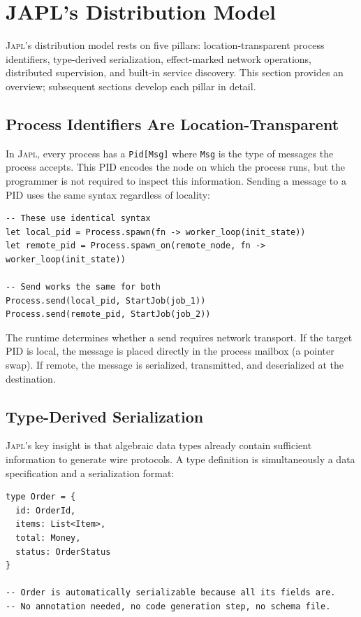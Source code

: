 \documentclass[11pt,a4paper]{article}
\newcommand{\japl}{\textsc{Japl}}
\begin{document}
\section{JAPL's Distribution Model}
\label{sec:japl-model}

\japl{}'s distribution model rests on five pillars: location-transparent
process identifiers, type-derived serialization, effect-marked network
operations, distributed supervision, and built-in service discovery. This
section provides an overview; subsequent sections develop each pillar in
detail.

\subsection{Process Identifiers Are Location-Transparent}

In \japl{}, every process has a \texttt{Pid[Msg]} where \texttt{Msg} is the
type of messages the process accepts. This PID encodes the node on which the
process runs, but the programmer is not required to inspect this information.
Sending a message to a PID uses the same syntax regardless of locality:

\begin{lstlisting}
-- These use identical syntax
let local_pid = Process.spawn(fn -> worker_loop(init_state))
let remote_pid = Process.spawn_on(remote_node, fn -> worker_loop(init_state))

-- Send works the same for both
Process.send(local_pid, StartJob(job_1))
Process.send(remote_pid, StartJob(job_2))
\end{lstlisting}

The runtime determines whether a send requires network transport. If the
target PID is local, the message is placed directly in the process mailbox
(a pointer swap). If remote, the message is serialized, transmitted, and
deserialized at the destination.

\subsection{Type-Derived Serialization}

\japl{}'s key insight is that algebraic data types already contain sufficient
information to generate wire protocols. A type definition is simultaneously
a data specification and a serialization format:

\begin{lstlisting}
type Order = {
  id: OrderId,
  items: List<Item>,
  total: Money,
  status: OrderStatus
}

-- Order is automatically serializable because all its fields are.
-- No annotation needed, no code generation step, no schema file.
\end{lstlisting}
\end{document}
